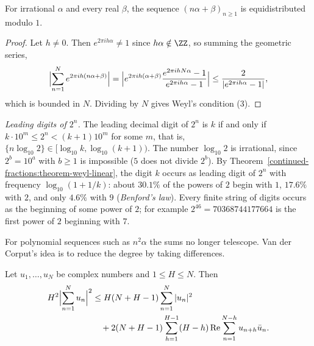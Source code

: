 \begin{theorem}\label{continued-fractions:theorem-weyl-linear}
For irrational $\alpha$ and every real $\beta$, the sequence $(n\alpha + \beta)_{n \geq 1}$ is equidistributed modulo $1$.
\end{theorem}

\begin{proof}
Let $h \neq 0$. Then $e^{2\pi ih\alpha} \neq 1$ since $h\alpha \notin \ZZ$, so summing the geometric series,
\[
\Bigl|\sum_{n=1}^Ne^{2\pi ih(n\alpha + \beta)}\Bigr| = \Bigl|e^{2\pi ih(\alpha + \beta)}\frac{e^{2\pi ihN\alpha} - 1}{e^{2\pi ih\alpha} - 1}\Bigr| \leq \frac{2}{|e^{2\pi ih\alpha} - 1|},
\]
which is bounded in $N$. Dividing by $N$ gives Weyl's condition (3).
\end{proof}

\begin{example}\label{continued-fractions:example-benford}
\emph{Leading digits of $2^n$.} The leading decimal digit of $2^n$ is $k$ if and only if $k \cdot 10^m \leq 2^n < (k + 1)10^m$ for some $m$, that is, $\{n\log_{10}2\} \in [\log_{10}k, \log_{10}(k + 1))$.
The number $\log_{10}2$ is irrational, since $2^b = 10^a$ with $b \geq 1$ is impossible ($5$ does not divide $2^b$). By Theorem~\ref{continued-fractions:theorem-weyl-linear}, the digit $k$ occurs as leading
digit of $2^n$ with frequency $\log_{10}(1 + 1/k)$: about $30.1\%$ of the powers of $2$ begin with $1$, $17.6\%$ with $2$, and only $4.6\%$ with $9$ (\emph{Benford's law}). Every finite string of digits
occurs as the beginning of some power of $2$; for example $2^{46} = 70368744177664$ is the first power of $2$ beginning with $7$.
\end{example}

For polynomial sequences such as $n^2\alpha$ the sums no longer telescope. Van der Corput's idea is to reduce the degree by taking differences.

\begin{lemma}\label{continued-fractions:lemma-van-der-corput}
Let $u_1, \ldots, u_N$ be complex numbers and $1 \leq H \leq N$. Then
\[
\begin{aligned}
H^2\Bigl|\sum_{n=1}^Nu_n\Bigr|^2 &\leq H(N + H - 1)\sum_{n=1}^N|u_n|^2\\
&\quad + 2(N + H - 1)\sum_{h=1}^{H-1}(H - h)\operatorname{Re}\sum_{n=1}^{N-h}u_{n+h}\bar{u}_n.
\end{aligned}
\]
\end{lemma}

